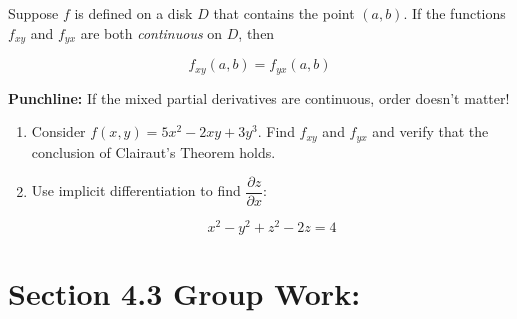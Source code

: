 \vspace*{.2in}

\df{\textcolor{sblack}{Clairaut's Theorem:}}

Suppose  \(f\) is defined on a disk \(D\) that contains the point \( (a,b) \).
If the functions \(f_{xy}\) and \(f_{yx}\) are both \textit{continuous} on \(D\), then

\[f_{xy}(a,b) = f_{yx}(a,b)\]

\textbf{Punchline:} If the mixed partial derivatives are continuous, order doesn't matter!





\begin{enumerate}[{Example} 1: ]
\item Consider \(f(x,y)=5x^2-2xy+3y^3\). Find \(f_{xy}\) and \(f_{yx}\) and verify that the conclusion of Clairaut's Theorem holds.
\vspace*{.5in}

\item Use implicit differentiation to find \(\dfrac{\partial z}{\partial x}\):

\[x^2-y^2+z^2-2z = 4\]


\end{enumerate}



\section*{Section 4.3 Group Work:}

